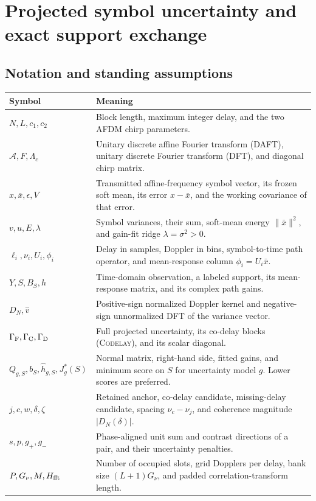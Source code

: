 \section{Projected symbol uncertainty and exact support exchange}
\label{sec:projected-uncertainty}

\theoremstyle{plain}
\newtheorem{afdmprop}{Proposition}
\newtheorem{afdmcor}{Corollary}
\theoremstyle{remark}
\newtheorem*{afdmremark}{Remark}

\subsection{Notation and standing assumptions}

\begin{center}
\small
\begin{tabular}{@{}p{.31\linewidth}p{.63\linewidth}@{}}
\hline
Symbol & Meaning \\ \hline
$N,L,c_1,c_2$ &
Block length, maximum integer delay, and the two AFDM chirp parameters. \\
$\mathcal A,F,\Lambda_c$ &
Unitary discrete affine Fourier transform (DAFT), unitary discrete Fourier
transform (DFT), and diagonal chirp matrix. \\
$x,\bar x,\epsilon,V$ &
Transmitted affine-frequency symbol vector, its frozen soft mean, its error
$x-\bar x$, and the working covariance of that error. \\
$v,u,E,\lambda$ &
Symbol variances, their sum, soft-mean energy $\|\bar x\|^2$, and gain-fit
ridge $\lambda=\sigma^2>0$. \\
$\ell_i,\nu_i,U_i,\phi_i$ &
Delay in samples, Doppler in bins, symbol-to-time path operator, and
mean-response column $\phi_i=U_i\bar x$. \\
$Y,S,B_S,h$ &
Time-domain observation, a labeled support, its mean-response matrix,
and its complex path gains. \\
$D_N,\widehat v$ &
Positive-sign normalized Doppler kernel and negative-sign unnormalized
DFT of the variance vector. \\
$\Gamma_{\rm F},\Gamma_{\rm C},\Gamma_{\rm D}$ &
Full projected uncertainty, its co-delay blocks (\textsc{Codelay}),
and its scalar diagonal. \\
$Q_{g,S},b_S,\hat h_{g,S},J_g^*(S)$ &
Normal matrix, right-hand side, fitted gains, and minimum score on $S$
for uncertainty model $g$. Lower scores are preferred. \\
$j,c,w,\delta,\zeta$ &
Retained anchor, co-delay candidate, missing-delay candidate,
spacing $\nu_c-\nu_j$, and coherence magnitude $|D_N(\delta)|$. \\
$s,p,g_+,g_-$ &
Phase-aligned unit sum and contrast directions of a pair, and their
uncertainty penalties. \\
$P,G_\nu,M,H_{\rm fft}$ &
Number of occupied slots, grid Dopplers per delay, bank size
$(L+1)G_\nu$, and padded correlation-transform length. \\
\hline
\end{tabular}
\end{center}

